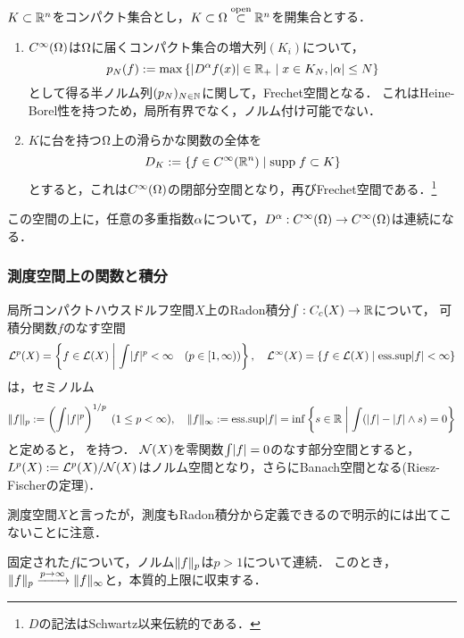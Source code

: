 \documentclass[uplatex,dvipdfmx]{jsreport}
\begin{document}
\begin{example}[滑らかな関数の空間と試験関数の空間]
    $K\subset\mathbb{R}^n$をコンパクト集合とし，$K\subset\Omega\overset{\mathrm{open}}{\subset}\mathbb{R}^n$を開集合とする．
    \begin{enumerate}
        \item  $C^\infty(\Omega)$は$\Omega$に届くコンパクト集合の増大列$(K_i)$について，
        \[p_N(f):=\max\left\{\lvert D^\alpha f(x)\rvert\in\mathbb{R}_+\mid x\in K_N,\lvert\alpha\rvert\le N\right\}\]
        として得る半ノルム列$(p_N)_{N\in\mathbb{N}}$に関して，Frechet空間となる．
        これはHeine-Borel性を持つため，局所有界でなく，ノルム付け可能でない．
        \item $K$に台を持つ$\Omega$上の滑らかな関数の全体を
        \[D_K:=\left\{f\in C^\infty(\mathbb{R}^n)\mid \mathrm{supp}\; f\subset K\right\}\]
        とすると，これは$C^\infty(\Omega)$の閉部分空間となり，再びFrechet空間である．\footnote{$D$の記法はSchwartz以来伝統的である．}
    \end{enumerate}
    この空間の上に，任意の多重指数$\alpha$について，$D^\alpha:C^\infty(\Omega)\to C^\infty(\Omega)$は連続になる．
\end{example}

\subsubsection{測度空間上の関数と積分}

\begin{example}[測度空間上の体値関数の同値類]\label{exp-Banach-space-of-Radon-integrable-functions}
    局所コンパクトハウスドルフ空間$X$上のRadon積分$\int:C_c(X)\to\mathbb{R}$について，
    可積分関数$f$のなす空間
    \begin{align*}
        \mathcal{L}^p(X)=\left\{f\in\mathcal{L}(X)\;\middle|\;\int\lvert f\rvert^p<\infty\quad(p\in[1,\infty))\right\},\quad\mathcal{L}^\infty(X)=\left\{f\in\mathcal{L}(X)\;\middle|\;\mathrm{ess.sup}\lvert f\rvert<\infty\right\}
    \end{align*}
    は，セミノルム
    \[\|f\|_p:=\left(\int\lvert f\rvert^p\right)^{1/p}\;(1\le p<\infty),\quad\|f\|_\infty:=\mathrm{ess.sup}\lvert f\rvert=\inf\left\{s\in\mathbb{R}\;\middle|\;\int(\lvert f\rvert-\lvert f\rvert\land s)=0\right\}\]と定めると，
    を持つ．
    $\mathcal{N}(X)$を零関数$\int\lvert f\rvert=0$のなす部分空間とすると，$L^p(X):=\mathcal{L}^p(X)/\mathcal{N}(X)$はノルム空間となり，さらにBanach空間となる(Riesz-Fischerの定理)．

    測度空間$X$と言ったが，測度もRadon積分から定義できるので明示的には出てこないことに注意．
\end{example}
\begin{remark}
    固定された$f$について，ノルム$\|f\|_p$は$p>1$について連続．
    このとき，$\|f\|_p\xrightarrow{p\to\infty}\|f\|_\infty$と，本質的上限に収束する．
\end{remark}
    
\end{document}
